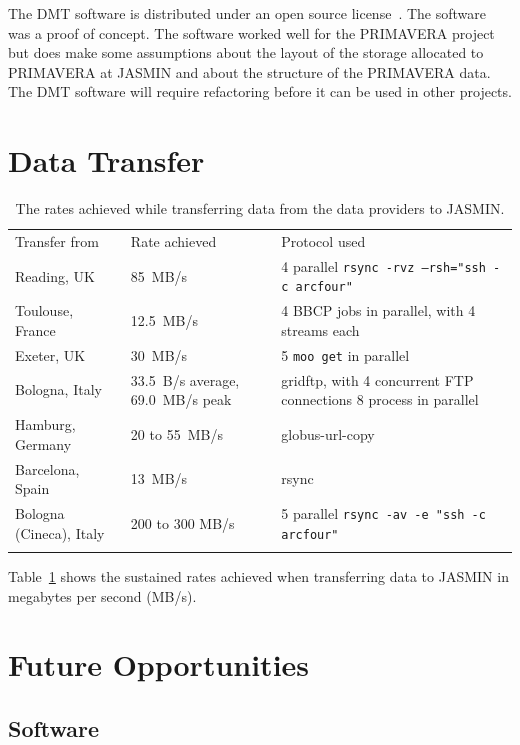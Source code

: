 \documentclass[gmd, manuscript]{copernicus}
\begin{document}
The DMT software is distributed under an open source license~\cite{Seddon2019}. The software was a proof of concept. The software worked well for the PRIMAVERA project but does make some assumptions about the layout of the storage allocated to PRIMAVERA at JASMIN and about the structure of the PRIMAVERA data. The DMT software will require refactoring before it can be used in other projects.

\section{Data Transfer}

\begin{table}[t]
\caption{The rates achieved while transferring data from the data providers to JASMIN.}
\begin{tabular}{lll}
\tophline
Transfer from & Rate achieved & Protocol used \\
\middlehline
Reading, UK & 85~MB/s & 4 parallel \texttt{rsync -rvz --rsh="ssh -c arcfour"} \\
Toulouse, France & 12.5~MB/s & 4 BBCP jobs in parallel, with 4 streams each \\
Exeter, UK & 30~MB/s & 5 \texttt{moo get} in parallel \\
Bologna, Italy & 33.5~B/s average, 69.0~MB/s peak & gridftp, with 4 concurrent FTP connections 8 process in parallel \\
Hamburg, Germany & 20 to 55~MB/s & globus-url-copy \\
Barcelona, Spain & 13~MB/s & rsync \\
Bologna (Cineca), Italy & 200 to 300 MB/s & 5 parallel \texttt{rsync -av -e "ssh -c arcfour"} \\
\bottomhline
\end{tabular}
\belowtable{} %
\label{rates_achieved}
\end{table}

Table~\ref{rates_achieved} shows the sustained rates achieved when transferring data to JASMIN in megabytes per second (MB/s).


\section{Future Opportunities}

\subsection{Software}
\end{document}
